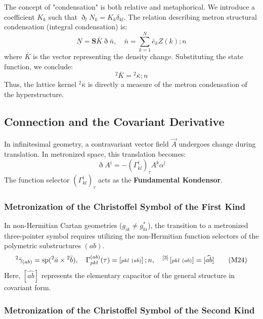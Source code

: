 \documentclass[11pt,a4paper,oneside]{article}
\DeclareMathOperator{\spn}{sp}
\newcommand{\ethop}{\eth}
\newcommand{\metroncap}[4][]{%
    \left[ \renewcommand{\arraystretch}{0.85} \substack{#2 \\ #3 \ #4} \right]_{#1}%
}
\begin{document}
The concept of "condensation" is both relative and metaphorical. We introduce a coefficient $K_k$ such that $\ethop_l N_k = K_k \delta_{kl}$. The relation describing metron structural condensation (integral condensation) is:
\begin{equation}
    \underline{N} = \boldsymbol{S} \bar{K} \ethop \bar{n}, \quad \bar{n} = \sum_{k=1}^N \bar{e}_k Z(k); n \tag{M23}
\end{equation}
where $\bar{K}$ is the vector representing the density change. Substituting the state function, we conclude:
\begin{equation}
    {}^2 \bar{K} = {}^2 \bar{\kappa}; n \tag{M23a}
\end{equation}
Thus, the lattice kernel ${}^2 \bar{\kappa}$ is directly a measure of the metron condensation of the hyperstructure.

\subsection{Connection and the Covariant Derivative}

In infinitesimal geometry, a contravariant vector field $\vec{A}$ undergoes change during translation. In metronized space, this translation becomes:
\begin{equation*}
    \ethop A^{\underline{i}} = -(\Gamma^{\underline{i}}_{kl})_{\tau} A^{\underline{k}} \alpha^{\underline{l}}
\end{equation*}
The function selector $(\Gamma^{\underline{i}}_{kl})_{\tau}$ acts as the \textbf{Fundamental Kondensor}.

\subsubsection{Metronization of the Christoffel Symbol of the First Kind}

In non-Hermitian Cartan geometries ($g_{ik} \neq g_{ki}^*$), the transition to a metronized three-pointer symbol requires utilizing the non-Hermitian function selectors of the polymetric substructures $(ab)$.
\begin{equation}
    {}^2\bar{\gamma}_{(ab)} = \spn({}^2\bar{a} \times {}^2\bar{b}), \quad \Gamma_{pkl}^{(ab)}(\tau) = \metroncap{ }{pkl}{(ab)}; n, \quad {}^{[3]}\metroncap{ }{pkl}{(ab)} = [\widehat{ab}] \tag{M24}
\end{equation}
Here, $[\widehat{ab}]$ represents the elementary capacitor of the general structure in covariant form.

\subsubsection{Metronization of the Christoffel Symbol of the Second Kind}
\end{document}

